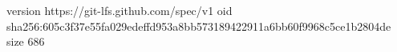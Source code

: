 version https://git-lfs.github.com/spec/v1
oid sha256:605c3f37e55fa029edeffd953a8bb573189422911a6bb60f9968c5ce1b2804de
size 686
